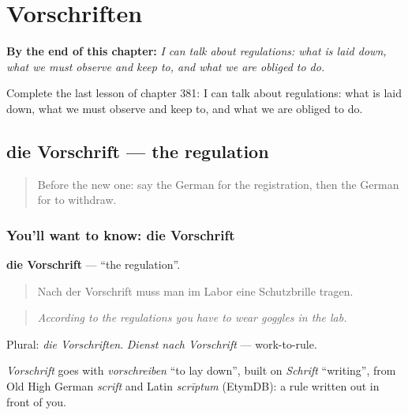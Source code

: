 
\chapter{Vorschriften}
\label{ch:ge-vorschriften}

\begin{chapteropening}
\textbf{By the end of this chapter:} \emph{I can talk about regulations: what is laid down, what we must observe and keep to, and what we are obliged to do.}

Complete the last lesson of chapter 381: I can talk about regulations: what is laid down, what we must observe and keep to, and what we are obliged to do.
\end{chapteropening}

\section[die Vorschrift]{die Vorschrift — the regulation}

\label{lesson:GE-C381-vorschrift}



\begin{quote}
Before the new one: say the German for the registration, then the German for to withdraw.
\end{quote}

\subsection*{You'll want to know: die Vorschrift}
\textbf{die Vorschrift} — \textquotedblleft{}the regulation\textquotedblright{}.

\begin{quote}
Nach der Vorschrift muss man im Labor eine Schutzbrille tragen.
\end{quote}

\begin{quote}
\emph{According to the regulations you have to wear goggles in the lab.}
\end{quote}

Plural: \emph{die Vorschriften}. \emph{Dienst nach Vorschrift} — work-to-rule.

\begin{cousinweb}
\emph{Vorschrift} goes with \emph{vorschreiben} \textquotedblleft{}to lay down\textquotedblright{}, built on \emph{Schrift} \textquotedblleft{}writing\textquotedblright{}, from Old High German \emph{scrift} and Latin \emph{scrīptum} (EtymDB): a rule written out in front of you.
\end{cousinweb}

